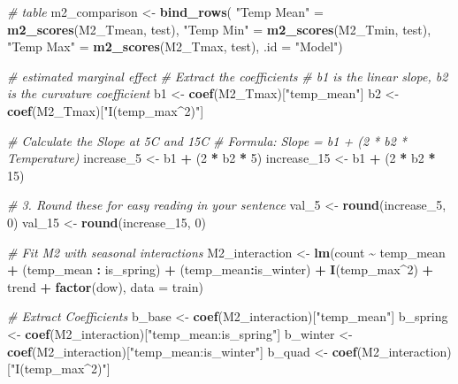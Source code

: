 \documentclass[
]{article}
\newenvironment{Shaded}{\begin{snugshade}}{\end{snugshade}}
\newcommand{\AttributeTok}[1]{\textcolor[rgb]{0.13,0.29,0.53}{#1}}
\newcommand{\CommentTok}[1]{\textcolor[rgb]{0.56,0.35,0.01}{\textit{#1}}}
\newcommand{\DecValTok}[1]{\textcolor[rgb]{0.00,0.00,0.81}{#1}}
\newcommand{\FunctionTok}[1]{\textcolor[rgb]{0.13,0.29,0.53}{\textbf{#1}}}
\newcommand{\NormalTok}[1]{#1}
\newcommand{\OtherTok}[1]{\textcolor[rgb]{0.56,0.35,0.01}{#1}}
\newcommand{\SpecialCharTok}[1]{\textcolor[rgb]{0.81,0.36,0.00}{\textbf{#1}}}
\newcommand{\StringTok}[1]{\textcolor[rgb]{0.31,0.60,0.02}{#1}}
\begin{document}
\begin{Shaded}
\begin{Highlighting}[]
\CommentTok{\# table}
\NormalTok{m2\_comparison }\OtherTok{\textless{}{-}} \FunctionTok{bind\_rows}\NormalTok{(}
  \StringTok{"Temp Mean"} \OtherTok{=} \FunctionTok{m2\_scores}\NormalTok{(M2\_Tmean, test),}
  \StringTok{"Temp Min"}  \OtherTok{=} \FunctionTok{m2\_scores}\NormalTok{(M2\_Tmin, test),}
  \StringTok{"Temp Max"}  \OtherTok{=} \FunctionTok{m2\_scores}\NormalTok{(M2\_Tmax, test),}
  \AttributeTok{.id =} \StringTok{"Model"}\NormalTok{)}

\CommentTok{\# estimated marginal effect}
\CommentTok{\# Extract the coefficients}
\CommentTok{\# b1 is the linear slope, b2 is the curvature coefficient}
\NormalTok{b1 }\OtherTok{\textless{}{-}} \FunctionTok{coef}\NormalTok{(M2\_Tmax)[}\StringTok{"temp\_mean"}\NormalTok{]}
\NormalTok{b2 }\OtherTok{\textless{}{-}} \FunctionTok{coef}\NormalTok{(M2\_Tmax)[}\StringTok{"I(temp\_max\^{}2)"}\NormalTok{]}

\CommentTok{\# Calculate the Slope at 5C and 15C}
\CommentTok{\# Formula: Slope = b1 + (2 * b2 * Temperature)}
\NormalTok{increase\_5  }\OtherTok{\textless{}{-}}\NormalTok{ b1 }\SpecialCharTok{+}\NormalTok{ (}\DecValTok{2} \SpecialCharTok{*}\NormalTok{ b2 }\SpecialCharTok{*} \DecValTok{5}\NormalTok{)}
\NormalTok{increase\_15 }\OtherTok{\textless{}{-}}\NormalTok{ b1 }\SpecialCharTok{+}\NormalTok{ (}\DecValTok{2} \SpecialCharTok{*}\NormalTok{ b2 }\SpecialCharTok{*} \DecValTok{15}\NormalTok{)}

\CommentTok{\# 3. Round these for easy reading in your sentence}
\NormalTok{val\_5  }\OtherTok{\textless{}{-}} \FunctionTok{round}\NormalTok{(increase\_5, }\DecValTok{0}\NormalTok{)}
\NormalTok{val\_15 }\OtherTok{\textless{}{-}} \FunctionTok{round}\NormalTok{(increase\_15, }\DecValTok{0}\NormalTok{)}

\CommentTok{\# Fit M2 with seasonal interactions}
\NormalTok{M2\_interaction }\OtherTok{\textless{}{-}} \FunctionTok{lm}\NormalTok{(count }\SpecialCharTok{\textasciitilde{}}\NormalTok{ temp\_mean }\SpecialCharTok{+}\NormalTok{ (temp\_mean }\SpecialCharTok{:}\NormalTok{ is\_spring) }\SpecialCharTok{+}\NormalTok{ (temp\_mean}\SpecialCharTok{:}\NormalTok{is\_winter) }\SpecialCharTok{+} 
                       \FunctionTok{I}\NormalTok{(temp\_max}\SpecialCharTok{\^{}}\DecValTok{2}\NormalTok{) }\SpecialCharTok{+}\NormalTok{ trend }\SpecialCharTok{+} \FunctionTok{factor}\NormalTok{(dow), }\AttributeTok{data =}\NormalTok{ train)}

\CommentTok{\# Extract Coefficients}
\NormalTok{b\_base   }\OtherTok{\textless{}{-}} \FunctionTok{coef}\NormalTok{(M2\_interaction)[}\StringTok{"temp\_mean"}\NormalTok{]}
\NormalTok{b\_spring }\OtherTok{\textless{}{-}} \FunctionTok{coef}\NormalTok{(M2\_interaction)[}\StringTok{"temp\_mean:is\_spring"}\NormalTok{]}
\NormalTok{b\_winter }\OtherTok{\textless{}{-}} \FunctionTok{coef}\NormalTok{(M2\_interaction)[}\StringTok{"temp\_mean:is\_winter"}\NormalTok{]}
\NormalTok{b\_quad   }\OtherTok{\textless{}{-}} \FunctionTok{coef}\NormalTok{(M2\_interaction)[}\StringTok{"I(temp\_max\^{}2)"}\NormalTok{]}


\end{Highlighting}
\end{Shaded}
\end{document}
